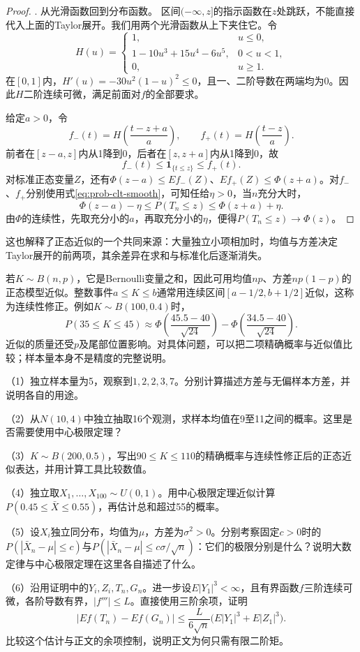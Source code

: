 \begin{proof}
\smallskip
{. 从光滑函数回到分布函数。}
区间\(({-\infty},z]\)的指示函数在\(z\)处跳跃，不能直接代入上面的Taylor展开。我们用两个光滑函数从上下夹住它。令
\[
 H(u)=\begin{cases}
 1,&u\le0,\\
 1-10u^3+15u^4-6u^5,&0<u<1,\\
 0,&u\ge1.
 \end{cases}
\]
在\([0,1]\)内，\(H'(u)=-30u^2(1-u)^2\le0\)，且一、二阶导数在两端均为0。因此\(H\)二阶连续可微，满足前面对\(f\)的全部要求。

给定\(a>0\)，令
\[
 f_-(t)=H\left(\frac{t-z+a}{a}\right),\qquad
 f_+(t)=H\left(\frac{t-z}{a}\right).
\]
前者在\([z-a,z]\)内从1降到0，后者在\([z,z+a]\)内从1降到0，故
\[
 f_-(t)\le\mathbf1_{\{t\le z\}}\le f_+(t).
\]
对标准正态变量\(Z\)，还有\(\Phi(z-a)\le Ef_-(Z)\)、\(Ef_+(Z)\le\Phi(z+a)\)。对\(f_-\)、\(f_+\)分别使用式\eqref{eq:prob-clt-smooth}，可知任给\(\eta>0\)，当\(n\)充分大时，
\[
 \Phi(z-a)-\eta\le P(T_n\le z)\le\Phi(z+a)+\eta.
\]
由\(\Phi\)的连续性，先取充分小的\(a\)，再取充分小的\(\eta\)，便得\(P(T_n\le z)\to\Phi(z)\)。
\end{proof}

这也解释了正态近似的一个共同来源：大量独立小项相加时，均值与方差决定Taylor展开的前两项，其余差异在求和与标准化后逐渐消失。

若\(K\sim B(n,p)\)，它是Bernoulli变量之和，因此可用均值\(np\)、方差\(np(1-p)\)的正态模型近似。整数事件\(a\le K\le b\)通常用连续区间\([a-1/2,b+1/2]\)近似，这称为{\heiti 连续性修正}。例如\(K\sim B(100,0.4)\)时，
\[
 P(35\le K\le45)\approx
 \Phi\left(\frac{45.5-40}{\sqrt{24}}\right)
 -\Phi\left(\frac{34.5-40}{\sqrt{24}}\right).
\]
近似的质量还受\(p\)及尾部位置影响。对具体问题，可以把二项精确概率与近似值比较；样本量本身不是精度的完整说明。

\begin{exercise}
\mbox{}\par\nobreak

（1）独立样本量为5，观察到\(1,2,2,3,7\)。分别计算描述方差与无偏样本方差，并说明各自的用途。

（2）从\(N(10,4)\)中独立抽取16个观测，求样本均值在9至11之间的概率。这里是否需要使用中心极限定理？

（3）\(K\sim B(200,0.5)\)，写出\(90\le K\le110\)的精确概率与连续性修正后的正态近似表达，并用计算工具比较数值。

（4）独立取\(X_1,\ldots,X_{100}\sim U(0,1)\)。用中心极限定理近似计算\(P(0.45\le\bar X\le0.55)\)，再估计总和超过55的概率。

（5）设\(X_i\)独立同分布，均值为\(\mu\)，方差为\(\sigma^2>0\)。分别考察固定\(c>0\)时的\(P(|\bar X_n-\mu|\le c)\)与\(P(|\bar X_n-\mu|\le c\sigma/\sqrt n)\)：它们的极限分别是什么？说明大数定律与中心极限定理在这里各自描述了什么。

（6）沿用证明中的\(Y_i,Z_i,T_n,G_n\)。进一步设\(E|Y_1|^3<\infty\)，且有界函数\(f\)三阶连续可微，各阶导数有界，\(|f'''|\le L\)。直接使用三阶余项，证明
\[
 |Ef(T_n)-Ef(G_n)|\le
 \frac{L}{6\sqrt n}\bigl(E|Y_1|^3+E|Z_1|^3\bigr).
\]
比较这个估计与正文的余项控制，说明正文为何只需有限二阶矩。
\end{exercise}
